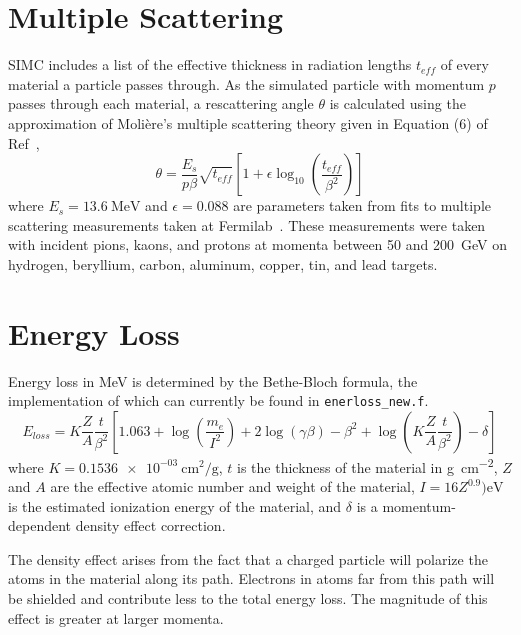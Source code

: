 \section{Multiple Scattering}

SIMC includes a list of the effective thickness in radiation lengths
$t_{eff}$ of every material a particle passes through.
As the simulated particle with momentum $p$ passes through each material, a
rescattering angle $\theta$ is calculated using the approximation of
Moli\`{e}re's multiple scattering theory given in Equation (6) of
Ref~\cite{Lynch_1991},
\begin{equation}
    \theta = \frac{E_s}{p \beta}
             \sqrt{t_{eff}}
             \left[1 + \epsilon \log_{10}{\left( \frac{t_{eff}}{\beta^2} \right)}\right]
\end{equation}
where $E_s=\SI{13.6}{\mega\electronvolt}$ and $\epsilon=0.088$ are parameters
taken from fits to multiple scattering measurements taken at
Fermilab~\cite{Shen_1979}.
These measurements were taken with incident pions, kaons, and protons at
momenta between 50 and \SI{200}{\giga\electronvolt} on hydrogen, beryllium,
carbon, aluminum, copper, tin, and lead targets.

\section{Energy Loss}
Energy loss in \si{\mega\electronvolt} is determined by the Bethe-Bloch formula,
the implementation of which can currently be found in \texttt{enerloss\_new.f}.
\begin{equation}
 E_{loss} =  K \frac{Z}{A} \frac{t}{\beta^2}
             \left[
                1.063
                + \log\left(\frac{m_e}{I^2}\right)
                + 2 \log(\gamma\beta)
                - \beta^2
                + \log\left(K\frac{Z}{A}\frac{t}{\beta^2}\right)
                - \delta
             \right]
\end{equation}
where
$K=\SI{0.1536e-03}{\centi\meter\squared\per\gram}$,
$t$ is the thickness of the material in \si{\gram\per\centi\meter\squared},
$Z$ and $A$ are the effective atomic number and weight of the material,
$I=16 Z^{0.9}) \si{\electronvolt}$ is the estimated ionization energy of the material,
and $\delta$ is a momentum-dependent density effect correction.

The density effect arises from the fact that a charged particle will polarize
the atoms in the material along its path.
Electrons in atoms far from this path will be shielded and contribute less to
the total energy loss.
The magnitude of this effect is greater at larger momenta.

